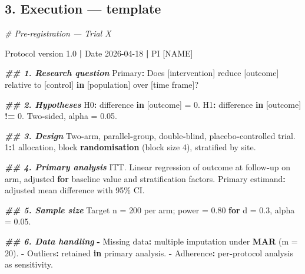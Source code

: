 \documentclass[
]{article}
\newenvironment{Shaded}{\begin{snugshade}}{\end{snugshade}}
\newcommand{\AttributeTok}[1]{\textcolor[rgb]{0.13,0.29,0.53}{#1}}
\newcommand{\CommentTok}[1]{\textcolor[rgb]{0.56,0.35,0.01}{\textit{#1}}}
\newcommand{\ControlFlowTok}[1]{\textcolor[rgb]{0.13,0.29,0.53}{\textbf{#1}}}
\newcommand{\DecValTok}[1]{\textcolor[rgb]{0.00,0.00,0.81}{#1}}
\newcommand{\DocumentationTok}[1]{\textcolor[rgb]{0.56,0.35,0.01}{\textbf{\textit{#1}}}}
\newcommand{\FloatTok}[1]{\textcolor[rgb]{0.00,0.00,0.81}{#1}}
\newcommand{\FunctionTok}[1]{\textcolor[rgb]{0.13,0.29,0.53}{\textbf{#1}}}
\newcommand{\NormalTok}[1]{#1}
\newcommand{\OtherTok}[1]{\textcolor[rgb]{0.56,0.35,0.01}{#1}}
\newcommand{\SpecialCharTok}[1]{\textcolor[rgb]{0.81,0.36,0.00}{\textbf{#1}}}
\begin{document}
\subsection{3. Execution --- template}\label{execution-template}

\begin{Shaded}
\begin{Highlighting}[]
\CommentTok{\# Pre{-}registration — Trial X}

\NormalTok{Protocol version }\FloatTok{1.0} \SpecialCharTok{|}\NormalTok{ Date }\DecValTok{2026{-}04{-}18} \SpecialCharTok{|}\NormalTok{ PI [NAME]}

\DocumentationTok{\#\# 1. Research question}
\NormalTok{Primary}\SpecialCharTok{:}\NormalTok{ Does [intervention] reduce [outcome] relative to [control]}
\ControlFlowTok{in}\NormalTok{ [population] over [time frame]?}

\DocumentationTok{\#\# 2. Hypotheses}
\NormalTok{H0}\SpecialCharTok{:}\NormalTok{ difference }\ControlFlowTok{in}\NormalTok{ [outcome] }\OtherTok{=} \FloatTok{0.}
\NormalTok{H1}\SpecialCharTok{:}\NormalTok{ difference }\ControlFlowTok{in}\NormalTok{ [outcome] }\SpecialCharTok{!=} \FloatTok{0.}\NormalTok{ Two}\SpecialCharTok{{-}}\NormalTok{sided, alpha }\OtherTok{=} \DecValTok{0}\NormalTok{.}\FloatTok{05.}

\DocumentationTok{\#\# 3. Design}
\NormalTok{Two}\SpecialCharTok{{-}}\NormalTok{arm, parallel}\SpecialCharTok{{-}}\NormalTok{group, double}\SpecialCharTok{{-}}\NormalTok{blind, placebo}\SpecialCharTok{{-}}\NormalTok{controlled trial.}
\DecValTok{1}\SpecialCharTok{:}\DecValTok{1}\NormalTok{ allocation, block }\FunctionTok{randomisation}\NormalTok{ (block size }\DecValTok{4}\NormalTok{), stratified by site.}

\DocumentationTok{\#\# 4. Primary analysis}
\NormalTok{ITT. Linear regression of outcome at follow}\SpecialCharTok{{-}}\NormalTok{up on arm, adjusted }\ControlFlowTok{for}
\NormalTok{baseline value and stratification factors. Primary estimand}\SpecialCharTok{:}
\NormalTok{adjusted mean difference with }\DecValTok{95}\NormalTok{\% CI.}

\DocumentationTok{\#\# 5. Sample size}
\NormalTok{Target n }\OtherTok{=} \DecValTok{200}\NormalTok{ per arm; power }\OtherTok{=} \FloatTok{0.80} \ControlFlowTok{for}\NormalTok{ d }\OtherTok{=} \FloatTok{0.3}\NormalTok{, alpha }\OtherTok{=} \DecValTok{0}\NormalTok{.}\FloatTok{05.}

\DocumentationTok{\#\# 6. Data handling}
\SpecialCharTok{{-}}\NormalTok{ Missing data}\SpecialCharTok{:}\NormalTok{ multiple imputation under }\FunctionTok{MAR}\NormalTok{ (}\AttributeTok{m =} \DecValTok{20}\NormalTok{).}
\SpecialCharTok{{-}}\NormalTok{ Outliers}\SpecialCharTok{:}\NormalTok{ retained }\ControlFlowTok{in}\NormalTok{ primary analysis.}
\SpecialCharTok{{-}}\NormalTok{ Adherence}\SpecialCharTok{:}\NormalTok{ per}\SpecialCharTok{{-}}\NormalTok{protocol analysis as sensitivity.}
\end{Highlighting}
\end{Shaded}
\end{document}
